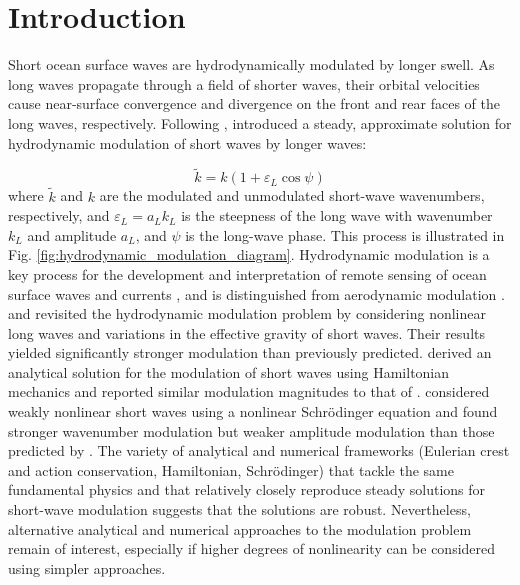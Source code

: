 \documentclass[lineno]{jfm}
\begin{document}

\section{Introduction}

Short ocean surface waves are hydrodynamically modulated by longer swell.
As long waves propagate through a field of shorter waves, their orbital
velocities cause near-surface convergence and divergence on the front and rear
faces of the long waves, respectively.
Following \citet{unna1941white,unna1942waves,unna1947sea},
\citet{longuet1960changes} introduced a steady, approximate solution for
hydrodynamic modulation of short waves by longer waves:

\begin{equation}
\label{eq:lhs1960wavenumber}
\widetilde{k} = k (1 + \varepsilon_L \cos{\psi})
\end{equation}
where $\widetilde{k}$ and $k$ are the modulated and unmodulated short-wave wavenumbers,
respectively, and $\varepsilon_L = a_L k_L$ is the steepness of the long wave with
wavenumber $k_L$ and amplitude $a_L$, and $\psi$ is the long-wave phase.
This process is illustrated in Fig. \ref{fig:hydrodynamic_modulation_diagram}.
Hydrodynamic modulation is a key process for the development and
interpretation of remote sensing of ocean surface waves and currents
\citep{keller1975microwave,hara1994hydrodynamic}, and is distinguished
from aerodynamic modulation \citep{donelan1987effect,belcher1999wave,chen2000effects}.
\citet{phillips1981dispersion} and \citet{longuet1987propagation} revisited the
hydrodynamic modulation problem by considering nonlinear long waves and
variations in the effective gravity of short waves.
Their results yielded significantly stronger modulation than previously predicted.
\citet{henyey1988energy} derived an analytical solution for the modulation of
short waves using Hamiltonian mechanics and reported similar modulation magnitudes
to that of \citet{longuet1987propagation}.
\citet{zhang1990evolution} considered weakly nonlinear short waves
using a nonlinear Schr\" odinger equation and found stronger wavenumber
modulation but weaker amplitude modulation than those predicted by
\citet{longuet1987propagation}.
The variety of analytical and numerical frameworks (Eulerian crest and action
conservation, Hamiltonian, Schr\" odinger) that tackle the same fundamental
physics and that relatively closely reproduce steady solutions for short-wave
modulation suggests that the solutions are robust.
Nevertheless, alternative analytical and numerical approaches to the modulation
problem remain of interest, especially if higher degrees of nonlinearity can be
considered using simpler approaches.
\end{document}

